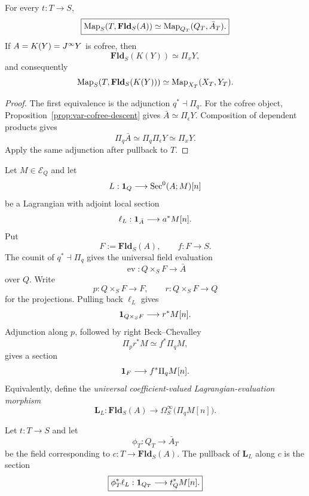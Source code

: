 \begin{proposition}
\label{prop:var-field-moduli-representing}
For every \(t:T\to S\),
\[
    \boxed{
    \operatorname{Map}_S(T,\mathbf{Fld}_S(A))
    \simeq
    \operatorname{Map}_{Q_T}(Q_T,\bar A_T).
    }
\]
If \(A=K(Y)=J^{\infty} Y\) is cofree, then
\[
    \boxed{
    \mathbf{Fld}_S(K(Y))
    \simeq
    \Pi_xY,
    }
\]
and consequently
\[
    \operatorname{Map}_S(T,\mathbf{Fld}_S(K(Y)))
    \simeq
    \operatorname{Map}_{X_T}(X_T,Y_T).
\]
\end{proposition}

\begin{proof}
The first equivalence is the adjunction \(q^*\dashv\Pi_q\).  For the cofree object, Proposition~\ref{prop:var-cofree-descent} gives \(\bar A\simeq\Pi_\epsilon Y\). Composition of dependent products gives
\[
    \Pi_q\bar A
    \simeq
    \Pi_q\Pi_\epsilon Y
    \simeq
    \Pi_xY.
\]
Apply the same adjunction after pullback to \(T\).
\end{proof}

\begin{construction}
\label{con:var-universal-lagrangian-evaluation}
Let \(M\in\mathcal E_Q\) and let
\[
    L:\mathbf 1_Q\longrightarrow\operatorname{Sec}^0(A;M)[n]
\]
be a Lagrangian with adjoint local section
\[
    \ell_L:\mathbf 1_{\bar A}\longrightarrow a^*M[n].
\]
Put
\[
    F:=\mathbf{Fld}_S(A),
    \qquad
    f:F\to S.
\]
The counit of \(q^*\dashv\Pi_q\) gives the universal field evaluation
\[
    \operatorname{ev}:
    Q\times_SF\longrightarrow\bar A
\]
over \(Q\). Write
\[
    p:Q\times_SF\to F,
    \qquad
    r:Q\times_SF\to Q
\]
for the projections. Pulling back \(\ell_L\) gives
\[
    \mathbf 1_{Q\times_SF}
    \longrightarrow
    r^*M[n].
\]
Adjunction along \(p\), followed by right Beck--Chevalley
\[
    \Pi_pr^*M
    \simeq
    f^*\Pi_qM,
\]
gives a section
\[
    \mathbf 1_F
    \longrightarrow
    f^*\Pi_qM[n].
\]
Equivalently, define the \emph{universal coefficient-valued Lagrangian-evaluation morphism}
\[
    \boxed{
    \mathbf L_L:
    \mathbf{Fld}_S(A)
    \longrightarrow
    \Omega_S^\infty
    \bigl(\Pi_qM[n]\bigr).
    }
\]
\end{construction}

\begin{proposition}
\label{prop:var-universal-lagrangian-field-evaluation}
Let \(t:T\to S\) and let
\[
    \phi_T:Q_T\to\bar A_T
\]
be the field corresponding to \(c:T\to\mathbf{Fld}_S(A)\).  The pullback of \(\mathbf L_L\) along \(c\) is the section
\[
    \boxed{
    \phi_T^*\ell_L:
    \mathbf 1_{Q_T}
    \longrightarrow
    t_Q^*M[n].
    }
\]
\end{proposition}


